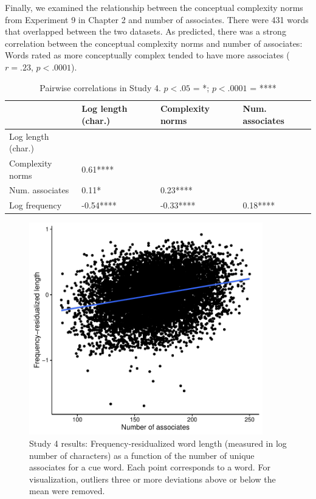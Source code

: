 Finally, we examined the relationship between the conceptual complexity norms from  Experiment 9 in Chapter 2  and number of associates. There were 431 words that overlapped between the two datasets. As predicted, there was a strong correlation between the conceptual complexity norms and number of associates: Words rated as more conceptually complex tended to have more associates ($r = .23$, $p< .0001$).


\begin{table}[t!]
\centering
\begin{tabular}{llll}
  \hline
 & Log length (char.)  & Complexity norms &   Num. associates  \\ 
  \hline
Log length (char.) &  &  &  \\ 
Complexity norms  &  0.61**** &  &  \\ 
Num. associates &  0.11*    &  0.23**** &  \\ 
Log frequency& -0.54**** & -0.33**** &  0.18**** \\ 
   \hline
\end{tabular}
\caption{Pairwise correlations in Study 4. $p<.05$ = *; $p<.0001$ = ****}
\label{study4corr}
\end{table}

  \begin{figure}
 \begin{center}
  \includegraphics[width=4in]{figs/associate_plot.pdf}
  \caption{\label{fig:associate_plot} Study 4 results: Frequency-residualized word length (measured in log number of characters) as a function of the number of unique associates for a cue word. Each point corresponds to a word. For visualization, outliers three or more deviations above or below the mean were removed.}
 \end{center}
\end{figure} 

